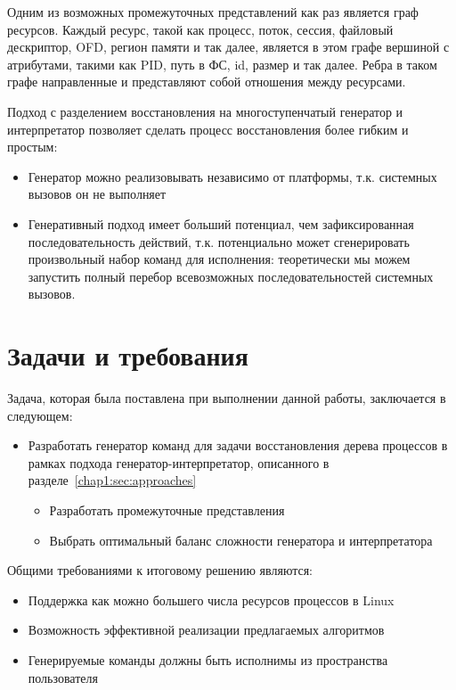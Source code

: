 Одним из возможных промежуточных представлений как раз является граф ресурсов. Каждый ресурс, такой как процесс, поток, сессия, файловый дескриптор, OFD, регион памяти и так далее, является в этом графе вершиной с атрибутами, такими как PID, путь в ФС, id, размер и так далее. Ребра в таком графе направленные и представляют собой отношения между ресурсами.

Подход с разделением восстановления на многоступенчатый генератор и интерпретатор позволяет сделать процесс восстановления более гибким и простым:
\begin{itemize}
	\item Генератор можно реализовывать независимо от платформы, т.к. системных вызовов он не выполняет
	\item Генеративный подход имеет больший потенциал, чем зафиксированная последовательность действий, т.к. потенциально может сгенерировать произвольный набор команд для исполнения: теоретически мы можем запустить полный перебор всевозможных последовательностей системных вызовов.
\end{itemize}

\section{Задачи и требования}

Задача, которая была поставлена при выполнении данной работы, заключается в следующем:

\begin{itemize}
	\item Разработать генератор команд для задачи восстановления дерева процессов в рамках подхода генератор-интерпретатор, описанного в разделе~\ref{chap1:sec:approaches}
	\begin{itemize}
		\item Разработать промежуточные представления
		\item Выбрать оптимальный баланс сложности генератора и интерпретатора
	\end{itemize}
\end{itemize}

Общими требованиями к итоговому решению являются:
\begin{itemize}
	\item Поддержка как можно большего числа ресурсов процессов в Linux
	\item Возможность эффективной реализации предлагаемых алгоритмов
	\item Генерируемые команды должны быть исполнимы из пространства пользователя
\end{itemize}

